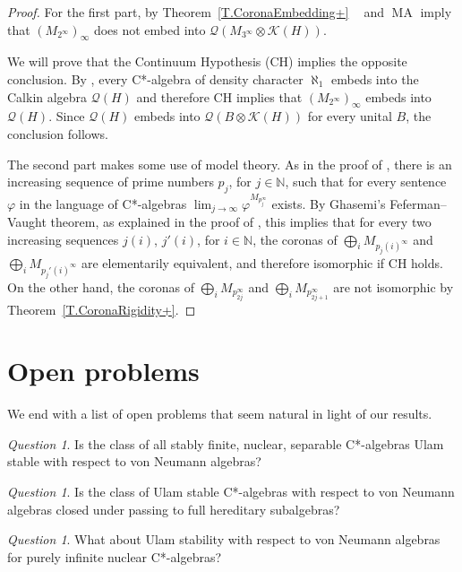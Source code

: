 \documentclass[11pt]{amsproc}
\newcommand{\bbN}{\mathbb N}
\newcommand{\cstar}{C*}
\newcommand{\cQ}{\mathcal Q}
\newcommand{\cK}{\mathcal K}
\DeclareMathOperator{\OCAT}{OCA_T}
\DeclareMathOperator{\MA}{MA}
\theoremstyle{definition}
\theoremstyle{plain}
\theoremstyle{remark}
\newtheorem{question}[definition]{Question}
\begin{document}
\begin{proof}
	For the first part, by  Theorem~\ref{T.CoronaEmbedding+} $\OCAT$ and $\MA$ imply that $(M_{2^\infty})_\infty$ does not embed into $\cQ(M_{3^\infty}\otimes \cK(H))$. 
	
We will prove that the Continuum Hypothesis (CH) implies the opposite conclusion. 
	By \cite[Theorem~A]{farah2017calkin}, 
	every \cstar-algebra of density character $\aleph_1$ embeds into the Calkin algebra $\cQ(H)$ and therefore CH implies that $(M_{2^\infty})_\infty$ embeds into $\cQ(H)$. Since $\cQ(H)$ embeds into $\cQ(B\otimes \cK(H))$ for every unital $B$, the conclusion follows. 
	
	
	The second part makes some use of model theory. As in the proof of \cite[Lemma~5.2]{ghasemi2014reduced}, there is an increasing sequence of prime numbers $p_j$, for $j\in \bbN$, such that for every sentence $\varphi$ in the language of \cstar-algebras $\lim_{j\to \infty} \varphi^{M_{p_j^\infty}}$ exists. By Ghasemi's Feferman--Vaught theorem, as explained in the proof of \cite[Proposition~5.3]{ghasemi2014reduced}, this implies that for every two increasing sequences $j(i)$, $j'(i)$, for $i\in \bbN$, the coronas of $\bigoplus_i  {M_{p_j(i)^\infty}}$ and 
$\bigoplus_i  {M_{p_j'(i)^\infty}}$ are elementarily equivalent, and therefore isomorphic if CH holds. 
On the other hand, the coronas of
$\bigoplus_i  {M_{p_{2j}^\infty}}$
and $\bigoplus_i  {M_{p_{2j+1}^\infty}}$ are not isomorphic by Theorem~\ref{T.CoronaRigidity+}. 
\end{proof}

\section{Open problems}

We end with a list of open problems that seem natural in light of our results.

\begin{question}
\label{P.UlamStability} Is the class of all stably finite, nuclear, separable \cstar-algebras Ulam stable with respect to von Neumann algebras?
\end{question}

\begin{question} Is the class of Ulam stable \cstar-algebras with respect to von Neumann algebras closed under passing to full hereditary subalgebras?
\end{question}

\begin{question}
What about Ulam stability with respect to von Neumann algebras for purely infinite nuclear \cstar-algebras?	
\end{question}
\end{document}
